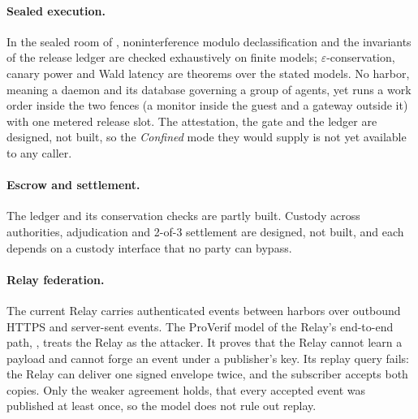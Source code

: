 \paragraph{Sealed execution.}
In the sealed room of , noninterference
modulo declassification and the invariants of the release ledger are checked
exhaustively on finite models; $\varepsilon$-conservation, canary power and
Wald latency are theorems over the stated models. No harbor, meaning a daemon and its database governing
a group of agents, yet runs a work order inside the two fences (a monitor
inside the guest and a gateway outside it) with one metered release slot. The
attestation, the gate and the ledger are designed, not built, so the
\emph{Confined} mode they would supply is not yet available to any caller.

\paragraph{Escrow and settlement.}
The ledger and its conservation checks are partly built. Custody across
authorities, adjudication and 2-of-3 settlement are designed, not built, and
each depends on a custody interface that no party can bypass.

\paragraph{Relay federation.}
\pdstatus{\BuiltWeak}{}
The current Relay carries authenticated events between harbors over outbound
HTTPS and server-sent events. The ProVerif model of the Relay's end-to-end
path, , treats the Relay as the attacker.
It proves that the Relay cannot learn a payload and cannot forge an event
under a publisher's key. Its replay query fails: the Relay can deliver one
signed envelope twice, and the subscriber accepts both copies. Only the weaker
agreement holds, that every accepted event was published at least once, so the
model does not rule out replay.


